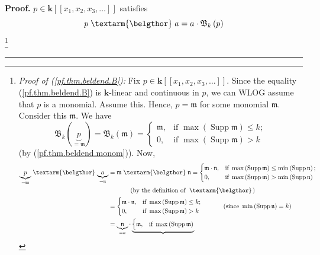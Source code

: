 \documentclass
[numbers=enddot,12pt,final,onecolumn,notitlepage,abstracton]{scrartcl}%
\theoremstyle{definition}
\newenvironment{proof}[1][Proof]{\noindent\textbf{#1.} }{\ \rule{0.5em}{0.5em}}
\newenvironment{verlong}{}{}
\newcommand{\bel}{\left. \textarm{\belgthor} \right.}
\begin{document}
\begin{proof}
\begin{verlong}
$p\in\mathbf{k}\left[  \left[  x_{1},x_{2},x_{3},\ldots\right]  \right]  $
satisfies%
\begin{equation}
p\bel a=a\cdot\mathfrak{B}_{k}\left(  p\right)  \label{pf.thm.beldend.B}%
\end{equation}
\footnote{\textit{Proof of (\ref{pf.thm.beldend.B}):} Fix $p\in\mathbf{k}%
\left[  \left[  x_{1},x_{2},x_{3},\ldots\right]  \right]  $. Since the
equality (\ref{pf.thm.beldend.B}) is $\mathbf{k}$-linear and continuous in
$p$, we can WLOG assume that $p$ is a monomial. Assume this. Hence,
$p=\mathfrak{m}$ for some monomial $\mathfrak{m}$. Consider this
$\mathfrak{m}$. We have%
\begin{equation}
\mathfrak{B}_{k}\left(  \underbrace{p}_{=\mathfrak{m}}\right)  =\mathfrak{B}%
_{k}\left(  \mathfrak{m}\right)  =%
\begin{cases}
\mathfrak{m}, & \text{if }\max\left(  \operatorname*{Supp}\mathfrak{m}\right)
\leq k;\\
0, & \text{if }\max\left(  \operatorname*{Supp}\mathfrak{m}\right)  >k
\end{cases}
\label{pf.thm.beldend.B.pf.2}%
\end{equation}
(by (\ref{pf.thm.beldend.monom})). Now,%
\begin{align*}
\underbrace{p}_{=\mathfrak{m}}\bel\underbrace{a}_{=\mathfrak{n}}  &
=\mathfrak{m}\bel\mathfrak{n}=%
\begin{cases}
\mathfrak{m}\cdot\mathfrak{n}, & \text{if }\max\left(  \operatorname*{Supp}%
\mathfrak{m}\right)  \leq\min\left(  \operatorname*{Supp}\mathfrak{n}\right)
;\\
0, & \text{if }\max\left(  \operatorname*{Supp}\mathfrak{m}\right)
>\min\left(  \operatorname*{Supp}\mathfrak{n}\right)
\end{cases}
\\
&  \ \ \ \ \ \ \ \ \ \ \left(  \text{by the definition of }\bel\right) \\
&  =%
\begin{cases}
\mathfrak{m}\cdot\mathfrak{n}, & \text{if }\max\left(  \operatorname*{Supp}%
\mathfrak{m}\right)  \leq k;\\
0, & \text{if }\max\left(  \operatorname*{Supp}\mathfrak{m}\right)  >k
\end{cases}
\ \ \ \ \ \ \ \ \ \ \left(  \text{since }\min\left(  \operatorname*{Supp}%
\mathfrak{n}\right)  =k\right) \\
&  =\underbrace{\mathfrak{n}}_{=a}\cdot\underbrace{%
\begin{cases}
\mathfrak{m}, & \text{if }\max\left(  \operatorname*{Supp}\mathfrak{m}\right)

\end{cases}}
\end{align*}}
\end{verlong}
\end{proof}
\end{document}
